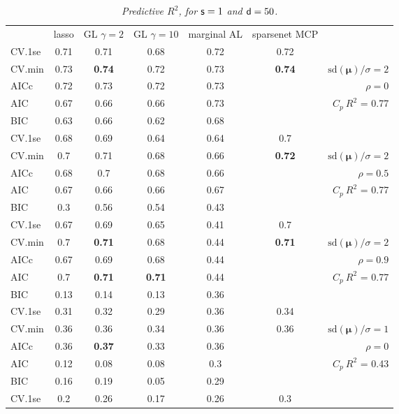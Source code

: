 \documentclass[12pt]{article}
\newcommand{\mr}[1]{\mathrm{#1}}
\newcommand{\bm}[1]{\mathbf{#1}}
\begin{document}
\begin{table}[p]\vspace{-.5cm}
\caption[l]{\label{r2}\it Predictive $R^2$, for ${\sf s}=1$ and  ${\sf d}=50$.}
\vspace{-.5cm}
\small{}
\begin{center}
\begin{tabular}{l*{5}{c}|r}
 & lasso & GL $\gamma=2$ & GL $\gamma=10$ & marginal AL & sparsenet MCP  &  \\
\cline{1-7}
CV.1se & 0.71 & 0.71 & 0.68 & 0.72 & 0.72 &\\
CV.min & 0.73 & {\bf 0.74} & 0.72 & 0.73 & {\bf 0.74} &  $\mr{sd}(\bm{\mu})/\sigma=2$ \\
AICc & 0.72 & 0.73 & 0.72 & 0.73 & & $\rho=0$ \\
AIC & 0.67 & 0.66 & 0.66 & 0.73 & & \multirow{2}{*}{$C_p ~ R^2$ = 0.77} \\
BIC & 0.63 & 0.66 & 0.62 & 0.68 & & \\
 \hline 
CV.1se & 0.68 & 0.69 & 0.64 & 0.64 & 0.7 &\\
CV.min & 0.7 & 0.71 & 0.68 & 0.66 & {\bf 0.72} &  $\mr{sd}(\bm{\mu})/\sigma=2$ \\
AICc & 0.68 & 0.7 & 0.68 & 0.66 & & $\rho=0.5$ \\
AIC & 0.67 & 0.66 & 0.66 & 0.67 & & \multirow{2}{*}{$C_p ~ R^2$ = 0.77} \\
BIC & 0.3 & 0.56 & 0.54 & 0.43 & & \\
 \hline 
CV.1se & 0.67 & 0.69 & 0.65 & 0.41 & 0.7 &\\
CV.min & 0.7 & {\bf 0.71} & 0.68 & 0.44 & {\bf 0.71} &  $\mr{sd}(\bm{\mu})/\sigma=2$ \\
AICc & 0.67 & 0.69 & 0.68 & 0.44 & & $\rho=0.9$ \\
AIC & 0.7 & {\bf 0.71} & {\bf 0.71} & 0.44 & & \multirow{2}{*}{$C_p ~ R^2$ = 0.77} \\
BIC & 0.13 & 0.14 & 0.13 & 0.36 & & \\
 \hline 
CV.1se & 0.31 & 0.32 & 0.29 & 0.36 & 0.34 &\\
CV.min & 0.36 & 0.36 & 0.34 & 0.36 & 0.36 &  $\mr{sd}(\bm{\mu})/\sigma=1$ \\
AICc & 0.36 & {\bf 0.37} & 0.33 & 0.36 & & $\rho=0$ \\
AIC & 0.12 & 0.08 & 0.08 & 0.3 & & \multirow{2}{*}{$C_p ~ R^2$ = 0.43} \\
BIC & 0.16 & 0.19 & 0.05 & 0.29 & & \\
 \hline 
CV.1se & 0.2 & 0.26 & 0.17 & 0.26 & 0.3 &\\

\end{tabular}
\end{center}
\end{table}
\end{document}
